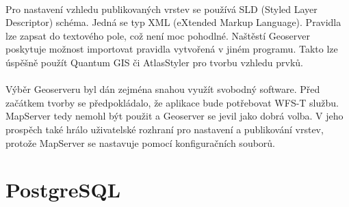 \documentclass[11pt,a4paper,titlepage,oneside]{book}
\begin{document}

		\paragraph{}Pro nastavení vzhledu publikovaných vrstev se používá SLD (Styled Layer Descriptor) schéma. Jedná se typ XML (eXtended Markup Language). Pravidla lze zapsat do textového pole, což není moc pohodlné. Naštěstí Geoserver poskytuje možnost importovat pravidla  vytvořená v jiném programu. Takto lze úspěšně použít Quantum GIS\cite{qgis} či AtlasStyler\cite{atlas} pro tvorbu vzhledu prvků.



		\paragraph{} Výběr Geoserveru byl dán zejména snahou využít svobodný software. Před začátkem tvorby se předpokládalo, že aplikace bude potřebovat WFS-T službu. MapServer tedy nemohl být použit a Geoserver se jevil jako dobrá volba. V jeho prospěch také hrálo uživatelské rozhraní pro nastavení a publikování vrstev, protože MapServer se nastavuje pomocí konfiguračních souborů.

	\section{PostgreSQL}





\end{document}
